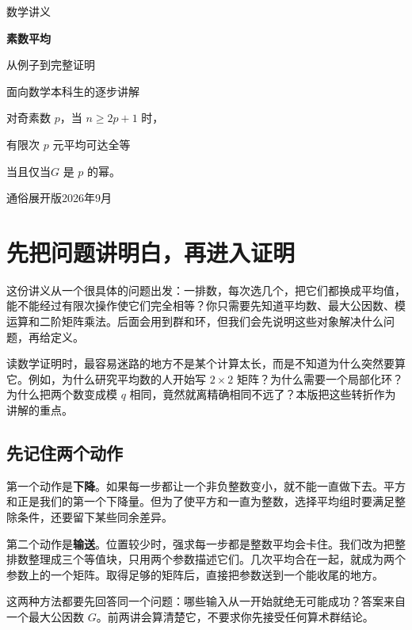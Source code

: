 \documentclass[11pt,a4paper,oneside,openany]{book}
\theoremstyle{definition}
\numberwithin{equation}{chapter}
\begin{document}
\frontmatter
\begin{titlepage}
\centering
\vspace*{25mm}
{\sffamily\Large 数学讲义\par}
\vspace{15mm}
{\Huge\bfseries 素数平均\par}
\vspace{7mm}
{\LARGE 从例子到完整证明\par}
\vspace{16mm}
{\large 面向数学本科生的逐步讲解\par}
\vfill
\begin{minipage}{.79\textwidth}
\large
对奇素数 $p$，当 $n\ge 2p+1$ 时，\par
有限次 $p$ 元平均可达全等\par
\hfill 当且仅当\quad $G$ 是 $p$ 的幂。
\end{minipage}
\vfill
{\large 通俗展开版\quad 2026年9月\par}
\end{titlepage}
\chapter*{先把问题讲明白，再进入证明}
这份讲义从一个很具体的问题出发：一排数，每次选几个，把它们都换成平均值，能不能经过有限次操作使它们完全相等？你只需要先知道平均数、最大公因数、模运算和二阶矩阵乘法。后面会用到群和环，但我们会先说明这些对象解决什么问题，再给定义。

读数学证明时，最容易迷路的地方不是某个计算太长，而是不知道为什么突然要算它。例如，为什么研究平均数的人开始写 $2\times2$ 矩阵？为什么需要一个局部化环？为什么把两个数变成模 $q$ 相同，竟然就离精确相同不远了？本版把这些转折作为讲解的重点。

\section*{先记住两个动作}
第一个动作是\textbf{下降}。如果每一步都让一个非负整数变小，就不能一直做下去。平方和正是我们的第一个下降量。但为了使平方和一直为整数，选择平均组时要满足整除条件，还要留下某些同余差异。

第二个动作是\textbf{输送}。位置较少时，强求每一步都是整数平均会卡住。我们改为把整排数整理成三个等值块，只用两个参数描述它们。几次平均合在一起，就成为两个参数上的一个矩阵。取得足够的矩阵后，直接把参数送到一个能收尾的地方。

这两种方法都要先回答同一个问题：哪些输入从一开始就绝无可能成功？答案来自一个最大公因数 $G$。前两讲会算清楚它，不要求你先接受任何算术群结论。
\end{document}
